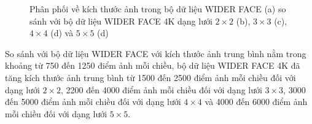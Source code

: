 {\begin{figure}[H]
        \caption{Phân phối về kích thước ảnh trong bộ dữ liệu WIDER FACE \cite{yang2016wider} (a) so sánh với bộ dữ liệu WIDER FACE 4K dạng lưới $2 \times 2$ (b), $3 \times 3$ (c), $4 \times 4$ (d) và $5 \times 5$ (d)}
        \label{fig:widerface_4k_img_size}
    \end{figure}

    \noindent
    So sánh với bộ dữ liệu WIDER FACE với kích thước ảnh trung bình nằm trong khoảng từ 750 đến 1250 điểm ảnh mỗi chiều, bộ dữ liệu WIDER FACE 4K đã tăng kích thước ảnh trung bình từ 1500 đến 2500 điểm ảnh mỗi chiều đối với dạng lưới $2 \times 2$, 2200 đến 4000 điểm ảnh mỗi chiều đối với dạng lưới $3 \times 3$, 3000 đến 5000 điểm ảnh mỗi chiều đối với dạng lưới $4 \times 4$ và 4000 đến 6000 điểm ảnh mỗi chiều đối với dạng lưới $5 \times 5$.

}

